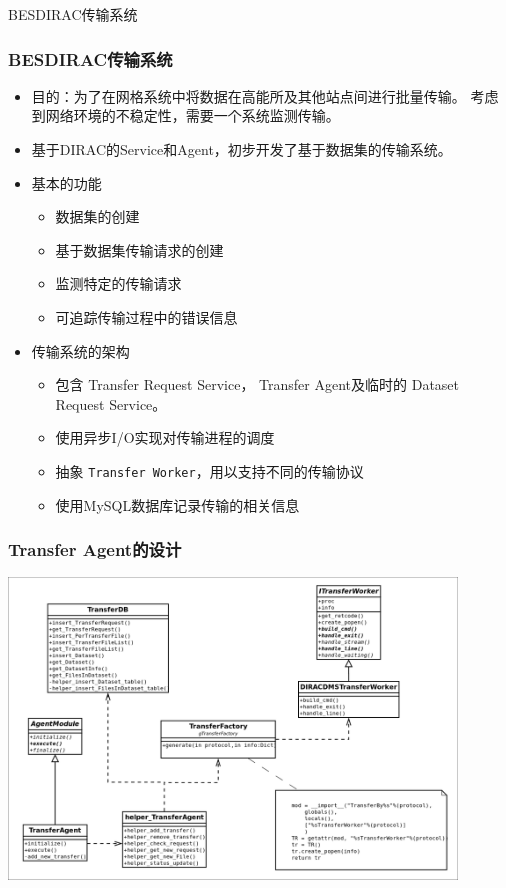 
\begin{frame}
    \begin{center}
        \LARGE BESDIRAC传输系统
    \end{center}
\end{frame}

\begin{frame}
    \frametitle{BESDIRAC传输系统}
    \begin{itemize}
        \item 目的：为了在网格系统中将数据在高能所及其他站点间进行批量传输。
                考虑到网络环境的不稳定性，需要一个系统监测传输。
        \item 基于DIRAC的Service和Agent，初步开发了基于数据集的传输系统。
        \item 基本的功能
            \begin{itemize}
                \item 数据集的创建
                \item 基于数据集传输请求的创建
                \item 监测特定的传输请求
                \item 可追踪传输过程中的错误信息
            \end{itemize}
        \item 传输系统的架构
            \begin{itemize}
                \item 包含 {Transfer Request Service}，
                      {Transfer Agent}及临时的
                      {Dataset Request Service}。
                \item 使用异步I/O实现对传输进程的调度
                \item 抽象 {\tt Transfer Worker}，用以支持不同的传输协议
                \item 使用MySQL数据库记录传输的相关信息
            \end{itemize}
    \end{itemize}
\end{frame}

\begin{frame}
    \frametitle{Transfer Agent的设计}
    \includegraphics[height=8cm,keepaspectratio]{data/TransferAgent.png}
\end{frame}

